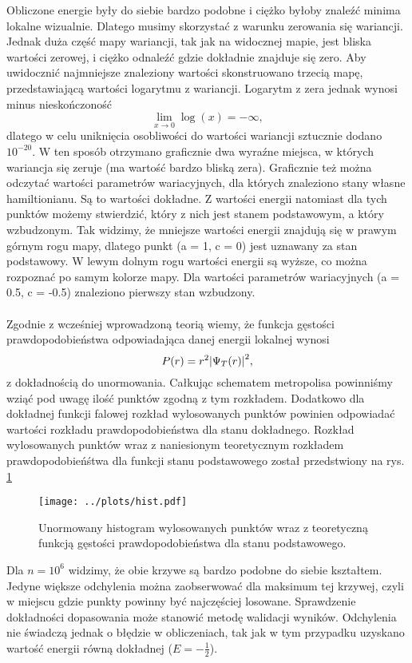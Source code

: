 \documentclass[12pt, a4paper]{article}
\begin{document}
    \noindent Obliczone energie były do siebie bardzo podobne i ciężko byłoby znaleźć minima lokalne wizualnie.
    Dlatego musimy skorzystać z warunku zerowania się wariancji.
    Jednak duża część mapy wariancji, tak jak na widocznej mapie, jest bliska wartości zerowej, i ciężko odnaleźć gdzie dokładnie znajduje się zero.
    Aby uwidocznić najmniejsze znaleziony wartości skonstruowano trzecią mapę, przedstawiającą wartości logarytmu z wariancji.
    Logarytm z zera jednak wynosi minus nieskończoność
    \[ \lim_{x \to 0} \log(x) = -\infty, \]
    dlatego w celu uniknięcia osobliwości do wartości wariancji sztucznie dodano $10^{-20}$. 
    W ten sposób otrzymano graficznie dwa wyraźne miejsca, w których wariancja się zeruje (ma wartość bardzo bliską zera).
    Graficznie też można odczytać wartości parametrów wariacyjnych, dla których znaleziono stany własne hamiltionianu.
    Są to wartości dokładne. 
    Z wartości energii natomiast dla tych punktów możemy stwierdzić, który z nich jest stanem podstawowym, a który wzbudzonym.
    Tak widzimy, że mniejsze wartości energii znajdują się w prawym górnym rogu mapy, dlatego punkt (a = 1, c = 0) jest uznawany za stan podstawowy.
    W lewym dolnym rogu wartości energii są wyższe, co można rozpoznać po samym kolorze mapy.
    Dla wartości parametrów wariacyjnych (a = 0.5, c = -0.5) znaleziono pierwszy stan wzbudzony.
    \\
    \\
    Zgodnie z wcześniej wprowadzoną teorią wiemy, że funkcja gęstości prawdopodobieństwa odpowiadająca danej energii lokalnej wynosi
    \[ P(r) = r^2 \abs{\Psi_T(r)}^2, \]
    z dokładnością do unormowania.
    Całkując schematem metropolisa powinniśmy wziąć pod uwagę ilość punktów zgodną z tym rozkładem.
    Dodatkowo dla dokładnej funkcji falowej rozkład wylosowanych punktów powinien odpowiadać wartości rozkładu prawdopodobieństwa dla stanu dokładnego.
    Rozkład wylosowanych punktów wraz z naniesionym teoretycznym rozkładem prawdopodobieńśtwa dla funkcji stanu podstawowego został przedstwiony na rys. \ref{hist}

    \begin{figure}[H]
        \centering
        \texttt{[image: ../plots/hist.pdf]}
        \caption{Unormowany histogram wylosowanych punktów wraz z teoretyczną funkcją gęstości prawdopodobieństwa dla stanu podstawowego.}
        \label{hist}
    \end{figure}

    \noindent Dla $n=10^6$ widzimy, że obie krzywe są bardzo podobne do siebie kształtem.
    Jedyne większe odchylenia można zaobserwować dla maksimum tej krzywej, czyli w miejscu gdzie punkty powinny być najczęściej losowane.
    Sprawdzenie dokładności dopasowania może stanowić metodę walidacji wyników.
    Odchylenia nie świadczą jednak o błędzie w obliczeniach, tak jak w tym przypadku uzyskano wartość energii równą dokładnej ($E = - \frac{1}{2}$).    
\end{document}

